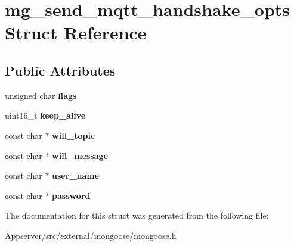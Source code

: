 \hypertarget{structmg__send__mqtt__handshake__opts}{}\section{mg\+\_\+send\+\_\+mqtt\+\_\+handshake\+\_\+opts Struct Reference}
\label{structmg__send__mqtt__handshake__opts}
\subsection*{Public Attributes}
\begin{DoxyCompactItemize}
\item 
unsigned char {\bfseries flags}\hypertarget{structmg__send__mqtt__handshake__opts_a89a41409815899bd7ed46a510a162bc8}{}\label{structmg__send__mqtt__handshake__opts_a89a41409815899bd7ed46a510a162bc8}

\item 
uint16\+\_\+t {\bfseries keep\+\_\+alive}\hypertarget{structmg__send__mqtt__handshake__opts_a39a20b37f0de09f81c6de35690f7d98f}{}\label{structmg__send__mqtt__handshake__opts_a39a20b37f0de09f81c6de35690f7d98f}

\item 
const char $\ast$ {\bfseries will\+\_\+topic}\hypertarget{structmg__send__mqtt__handshake__opts_a7cdd8f59da7f39ccd8face3e7267d634}{}\label{structmg__send__mqtt__handshake__opts_a7cdd8f59da7f39ccd8face3e7267d634}

\item 
const char $\ast$ {\bfseries will\+\_\+message}\hypertarget{structmg__send__mqtt__handshake__opts_a747846d48256c35b24544a1e19321f09}{}\label{structmg__send__mqtt__handshake__opts_a747846d48256c35b24544a1e19321f09}

\item 
const char $\ast$ {\bfseries user\+\_\+name}\hypertarget{structmg__send__mqtt__handshake__opts_a3110a5a3589f32974b23f442b970ee85}{}\label{structmg__send__mqtt__handshake__opts_a3110a5a3589f32974b23f442b970ee85}

\item 
const char $\ast$ {\bfseries password}\hypertarget{structmg__send__mqtt__handshake__opts_ac16baef17869ac723d502190b19780bf}{}\label{structmg__send__mqtt__handshake__opts_ac16baef17869ac723d502190b19780bf}

\end{DoxyCompactItemize}


The documentation for this struct was generated from the following file\+:\begin{DoxyCompactItemize}
\item 
Appserver/src/external/mongoose/mongoose.\+h\end{DoxyCompactItemize}
